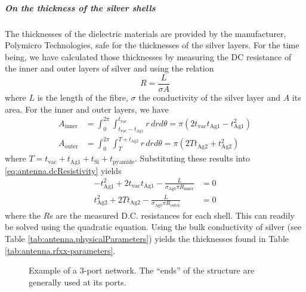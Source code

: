 \subparagraph{On the thickness of the silver shells}
The thicknesses of the dielectric materials are provided by the manufacturer, 
Polymicro Technologies, safe for the thicknesses of the silver layers. 
For the time being, we have calculated those thicknesses by measuring
the DC resistance of the inner and outer layers of silver and
using the relation \cite[p.~204]{CHE1989}
  \begin{equation}
    \label{eq:active.antennae.dcResistivity}
    R = \frac{L}{\sigma A}
  \end{equation}
where $L$ is the length of the fibre, $\sigma$ the conductivity of the silver
layer and $A$ its area. For the inner and outer layers, we have
  \begin{align}
    A_\text{inner}	&= \int_0^{2\pi}\int_{t_\text{vac}-t_\text{Ag1}}^{t_\text{vac}}r\,dr d\theta= \pi\left(2t_\text{vac}t_\text{Ag1}-t_\text{Ag1}^2\right)	\\
    A_\text{outer}	&= \int_0^{2\pi}\int_T^{T+t_\text{Ag2}}r\,dr d\theta = \pi\left(2Tt_\text{Ag2}+t_\text{Ag2}^2\right)
  \end{align}
where $T=t_\text{vac}+t_\text{Ag1}+t_\text{Si}+t_\text{pyamide}$. 
Substituting these results into \eqref{eq:antenna.dcResistivity}
yields
  \begin{subequations}
  \label{eq:active.antennae.thickGeneralEquations}
  \begin{align}  
   -t_\text{Ag1}^2 + 2t_\text{vac}t_\text{Ag1}-\frac{L}{\sigma_\text{Ag0}\pi R_\text{inner}}	&=0	\\
   t_\text{Ag2}^2 + 2Tt_\text{Ag2}-\frac{L}{\sigma_\text{Ag0}\pi R_\text{outer}}			&=0
  \end{align}
  \end{subequations}
where the $R$s are the measured D.C. resistances for each shell. 
This can readily be solved using the quadratic equation. Using the bulk conductivity
of silver (see Table \ref{tab:antenna.physicalParameters}) yields the 
thicknesses found in Table \ref{tab:antenna.rfxx-parameters}.

\begin{figure}
 \begin{center}
 \end{center}
 \caption[Example of a 3-port network]{Example of a 3-port network. The ``ends'' of the structure are generally used at its ports.}
 \label{fig:active.antennae.network}
\end{figure}

